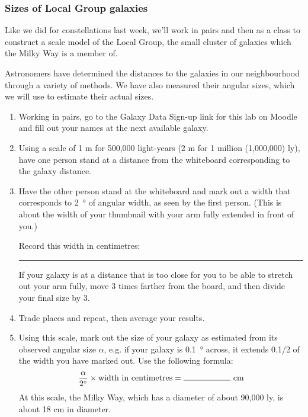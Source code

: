 \documentclass[main.tex]{subfiles}
\begin{document}
\subsubsection{Sizes of Local Group galaxies}
Like we did for constellations last week, we'll work in pairs and then as a class to construct a scale model of the Local Group, the small cluster of galaxies which the Milky Way is a member of. 

Astronomers have determined the distances to the galaxies in our neighbourhood through a variety of methods. We have also measured their angular sizes, which we will use to estimate their actual sizes.
\begin{enumerate}
\item Working in pairs, go to the Galaxy Data Sign-up link for this lab on Moodle and fill out your names at the next available galaxy.
\item Using a scale of 1 m for 500,000 light-years (2 m for 1 million (1,000,000) ly), have one person stand at a distance from the whiteboard corresponding to the galaxy distance.
\item Have the other person stand at the whiteboard and mark out a width that corresponds to \SI{2}{\degree} of angular width, as seen by the first person. (This is about the width of your thumbnail with your arm fully extended in front of you.) 

Record this width in centimetres: \rule{2cm}{.15mm}

If your galaxy is at a distance that is too close for you to be able to stretch out your arm fully, move 3 times farther from the board, and then divide your final size by 3.

\item Trade places and repeat, then average your results.
\item Using this scale, mark out the size of your galaxy as estimated from its observed angular size $\alpha$, e.g. if your galaxy is \SI{0.1}{\degree} across, it extends 0.1/2 of the width you have marked out. Use the following formula:
\begin{equation*}
\frac{\alpha}{\SI{2}{\degree}} \times \text{width in centimetres} = \rule{2cm}{.15mm}\ \si{\cm}
\end{equation*}
At this scale, the Milky Way, which has a diameter of about 90,000 ly, is about 18 cm in diameter.


\end{enumerate}
\end{document}
